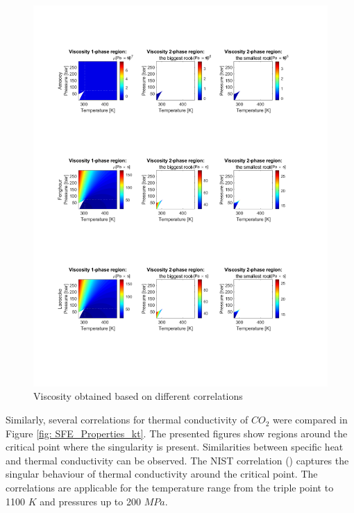 \documentclass[../Article_Model_Parameters.tex]{subfiles}
\begin{document}
\begin{figure}[H]
		\includegraphics[trim = 1.5cm 4.0cm 2.5cm 19.0cm,clip,width=\textwidth]{Figures/MU.pdf}	
		\caption{Viscosity obtained based on different correlations } 
		\label{fig: SFE_Properties_mu}
	\end{figure} 
	
	Similarly, several correlations for thermal conductivity of $CO_2$ were compared in Figure \ref{fig: SFE_Properties_kt}. The presented figures show regions around the critical point where the singularity is present. Similarities between specific heat and thermal conductivity can be observed. The NIST correlation (\citet{Huber2016}) captures the singular behaviour of thermal conductivity around the critical point. The correlations are applicable for the temperature range from the triple point to 1100 $K$ and pressures up to 200 $MPa$. 
	
\end{document}

